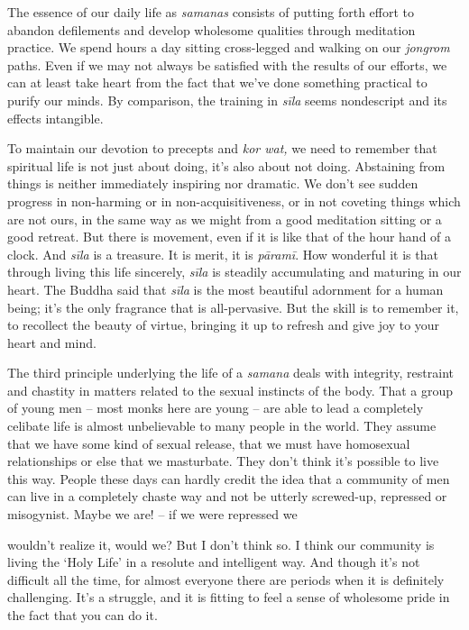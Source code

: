The essence of our daily life as \emph{samanas} consists of putting
forth effort to abandon defilements and develop wholesome qualities
through meditation practice. We spend hours a day sitting cross-legged
and walking on our \emph{jongrom} paths. Even if we may not always be
satisfied with the results of our efforts, we can at least take heart
from the fact that we've done something practical to purify our minds.
By comparison, the training in \emph{sīla} seems nondescript and its
effects intangible.

To maintain our devotion to precepts and \emph{kor wat,} we need to
remember that spiritual life is not just about doing, it's also about
not doing. Abstaining from things is neither immediately inspiring nor
dramatic. We don't see sudden progress in non-harming or in
non-acquisitiveness, or in not coveting things which are not ours, in
the same way as we might from a good meditation sitting or a good
retreat. But there is movement, even if it is like that of the hour hand
of a clock. And \emph{sīla} is a treasure. It is merit, it is
\emph{pāramī}. How wonderful it is that through living this life
sincerely, \emph{sīla} is steadily accumulating and maturing in our
heart. The Buddha said that \emph{sīla} is the most beautiful adornment
for a human being; it's the only fragrance that is all-pervasive. But
the skill is to remember it, to recollect the beauty of virtue, bringing
it up to refresh and give joy to your heart and mind.

The third principle underlying the life of a \emph{samana} deals with
integrity, restraint and chastity in matters related to the sexual
instincts of the body. That a group of young men -- most monks here are
young -- are able to lead a completely celibate life is almost
unbelievable to many people in the world. They assume that we have some
kind of sexual release, that we must have homosexual relationships or
else that we masturbate. They don't think it's possible to live this
way. People these days can hardly credit the idea that a community of
men can live in a completely chaste way and not be utterly screwed-up,
repressed or misogynist. Maybe we are! -- if we were repressed we

wouldn't realize it, would we? But I don't think so. I think our
community is living the `Holy Life' in a resolute and intelligent way.
And though it's not difficult all the time, for almost everyone there
are periods when it is definitely challenging. It's a struggle, and it
is fitting to feel a sense of wholesome pride in the fact that you can
do it.

